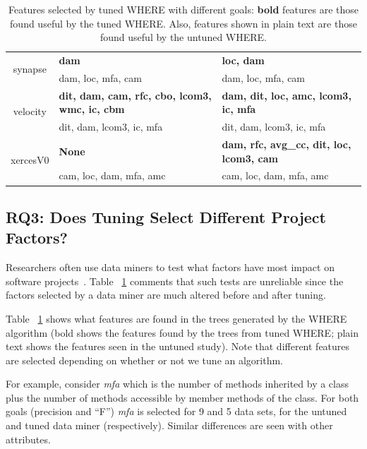 \documentclass{sig-alternative}
\newcommand{\tab}[1]{Table ~\ref{tab:#1}}
\begin{document}
\begin{table}[!ht]
\begin{tabular}{c|p{1in}|p{1in}}
   \hline
   \multirow{2}{*}{synapse} &{\bf  dam} & {\bf loc, dam} \\
        & dam, loc, mfa, cam & dam, loc, mfa, cam\\
    \hline
   \multirow{2}{*}{velocity} & {\bf dit, dam, cam, rfc, cbo, lcom3, wmc, ic, cbm }& {\bf dam, dit, loc, amc, lcom3, ic, mfa }\\
        & dit, dam, lcom3, ic, mfa  & dit, dam, lcom3, ic, mfa\\
    \hline
   \multirow{2}{*}{xercesV0} &{\bf  None }&{\bf  dam, rfc, avg\_cc, dit, loc, lcom3, cam }\\
        & cam, loc, dam, mfa, amc &  cam, loc, dam, mfa, amc \\
    \hline
    
  \end{tabular}
  
    \caption{Features selected by tuned WHERE with different goals:
    {\bf bold} features are those found useful by the tuned WHERE.
    Also, features shown in plain text are those found useful by the untuned WHERE.
    }\label{tab:features}
\end{table}


 \subsection{RQ3: Does Tuning Select Different Project Factors? }\label{sect:import}


Researchers often use data miners to  test what factors have most impact on software projects~\cite{bell2013limited,rahman2013how,me02k,Moser:2008,zimmermann2007predicting,herzig2013predicting}. 
\tab{features} comments that such tests are unreliable since the factors selected by a data miner are much altered before and 
after tuning.

\tab{features} shows what features are found in the trees generated by the WHERE algorithm
(bold shows the features found by the trees from tuned WHERE; plain text shows the features seen
in the untuned study). Note that different features are selected depending on whether or not
we tune an algorithm.

For example, consider {\em mfa} which is the
number of methods inherited by a class plus the number of methods accessible by member methods of the class.
For both goals (precision and ``F'') {\em mfa} is selected for 9 and 5 data sets,
for the untuned and tuned data miner (respectively).
Similar differences are   seen with other attributes.
\end{document}
